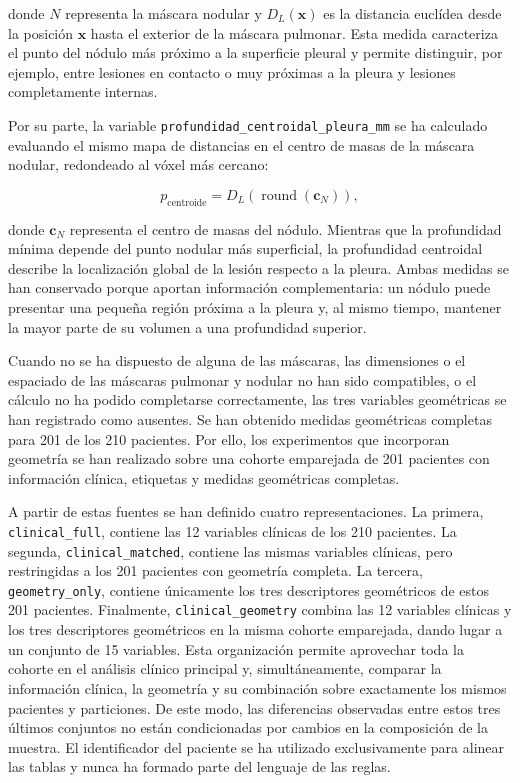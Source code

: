donde \(N\) representa la máscara nodular y \(D_L(\mathbf{x})\) es la distancia euclídea desde la posición \(\mathbf{x}\) hasta el exterior de la máscara pulmonar. Esta medida caracteriza el punto del nódulo más próximo a la superficie pleural y permite distinguir, por ejemplo, entre lesiones en contacto o muy próximas a la pleura y lesiones completamente internas.

Por su parte, la variable \texttt{profundidad\_centroidal\_pleura\_mm} se ha calculado evaluando el mismo mapa de distancias en el centro de masas de la máscara nodular, redondeado al vóxel más cercano:

\[
p_{\mathrm{centroide}}
=
D_L\left(\operatorname{round}(\mathbf{c}_N)\right),
\]

donde \(\mathbf{c}_N\) representa el centro de masas del nódulo. Mientras que la profundidad mínima depende del punto nodular más superficial, la profundidad centroidal describe la localización global de la lesión respecto a la pleura. Ambas medidas se han conservado porque aportan información complementaria: un nódulo puede presentar una pequeña región próxima a la pleura y, al mismo tiempo, mantener la mayor parte de su volumen a una profundidad superior.


Cuando no se ha dispuesto de alguna de las máscaras, las dimensiones o el espaciado de las máscaras pulmonar y nodular no han sido compatibles, o el cálculo no ha podido completarse correctamente, las tres variables geométricas se han registrado como ausentes. Se han obtenido medidas geométricas completas para 201 de los 210 pacientes. Por ello, los experimentos que incorporan geometría se han realizado sobre una cohorte emparejada de 201 pacientes con información clínica, etiquetas y medidas geométricas completas.

A partir de estas fuentes se han definido cuatro representaciones. La primera, \texttt{clinical\_full}, contiene las 12 variables clínicas de los 210 pacientes. La segunda, \texttt{clinical\_matched}, contiene las mismas variables clínicas, pero restringidas a los 201 pacientes con geometría completa. La tercera, \texttt{geometry\_only}, contiene únicamente los tres descriptores geométricos de estos 201 pacientes. Finalmente, \texttt{clinical\_geometry} combina las 12 variables clínicas y los tres descriptores geométricos en la misma cohorte emparejada, dando lugar a un conjunto de 15 variables. Esta organización permite aprovechar toda la cohorte en el análisis clínico principal y, simultáneamente, comparar la información clínica, la geometría y su combinación sobre exactamente los mismos pacientes y particiones. De este modo, las diferencias observadas entre estos tres últimos conjuntos no están condicionadas por cambios en la composición de la muestra. El identificador del paciente se ha utilizado exclusivamente para alinear las tablas y nunca ha formado parte del lenguaje de las reglas.

